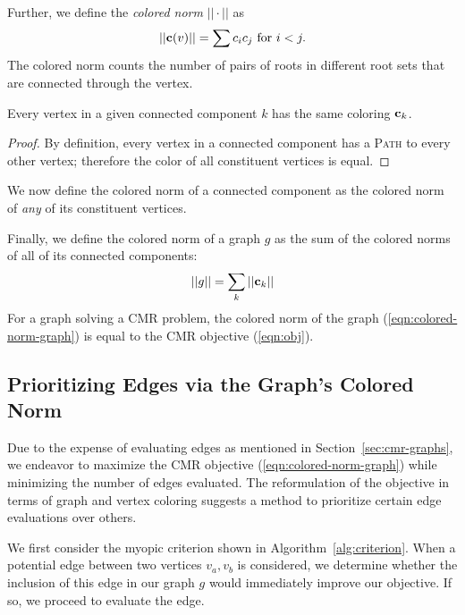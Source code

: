 Further, we define the \emph{colored norm} $||\cdot||$ as
\begin{equation}
   ||{\bf c}(v)|| = \sum c_i c_j \mbox{ for } i < j.
\end{equation}
The colored norm counts the number of pairs of roots in different root sets
that are connected through the vertex. 

\begin{proposition}
Every vertex in a given connected component $k$ has the same coloring
${\bf c}_k$.
\end{proposition}
\begin{proof}
By definition, every vertex in a connected component has a
\textsc{Path} to every other vertex;
therefore the color of all constituent vertices is equal.
\end{proof}

We now define the colored norm of a connected component as the colored norm
of \emph{any} of its constituent vertices.

Finally, we define the colored norm of a graph $g$
as the sum of the colored norms of all of its connected components:
\begin{equation}
   \label{eqn:colored-norm-graph}
   ||g|| = \sum_k ||{\bf c}_k||
\end{equation}
For a graph solving a CMR problem,
the colored norm of the graph (\ref{eqn:colored-norm-graph})
is equal to the CMR objective (\ref{eqn:obj}).

\subsection{Prioritizing Edges via the Graph's Colored Norm}

Due to the expense of evaluating edges
as mentioned in Section~\ref{sec:cmr-graphs},
we endeavor to maximize the CMR objective
(\ref{eqn:colored-norm-graph})
while minimizing the number of edges evaluated.
The reformulation of the objective in terms of graph and vertex coloring
suggests a method to prioritize certain edge evaluations over others.

We first consider the myopic criterion
shown in Algorithm~\ref{alg:criterion}.
When a potential edge between two vertices $v_a,v_b$ is considered,
we determine whether the inclusion of this edge in our graph $g$
would immediately improve our objective.
If so, we proceed to evaluate the edge.

